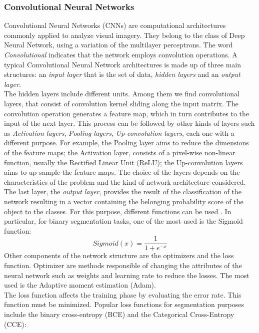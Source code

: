 \documentclass{standalone}
\begin{document}
\subsubsection{Convolutional Neural Networks} 
Convolutional Neural Networks (CNNs) are computational architectures commonly applied to analyze visual imagery.
They belong to the class of Deep Neural Network, using a variation of the multilayer perceptrons.
The word \textit{Convolutional} indicates that the network employs convolution operations.
A typical Convolutional Neural Network architectures is made up of three main structures: an \textit{input layer} that is the set of data, \textit{hidden layers} and an \textit{output layer}.
\\
The hidden layers include different units.
Among them we find convolutional layers, that consist of convolution kernel sliding along the input matrix.
The convolution operation generates a feature map, which in turn contributes to the input of the next layer\cite{CNN}.
This process can be followed by other kinds of layers such as \textit{Activation layers}, \textit{Pooling layers}, \textit{Up-convolution layers}, each one with a different purpose.
For example, the Pooling layer aims to reduce the dimensions of the feature maps; the Activation layer, consists of a pixel-wise non-linear function, usually the Rectified Linear Unit (ReLU); the Up-convolution layers aims to up-sample the feature maps.
The choice of the layers depends on the characteristics of the problem and the kind of network architecture considered.
\\
The last layer, the \textit{output layer}, provides the result of the classification of the network resulting in a vector containing the belonging probability score of the object to the classes.
For this purpose, different functions can be used \cite{camborata}.
In particular, for binary segmentation tasks, one of the most used is the Sigmoid function:
\begin{equation}
    Sigmoid(x) = \frac{1}{1 + e^{-x}}
\end{equation}
Other components of the network structure are the optimizers and the loss function. 
Optimizer are methods responsible of changing the attributes of the neural network such as weights and learning rate to reduce the losses. 
The most used is the Adaptive moment estimation (Adam)\cite{jovana}. 
\\
The loss function affects the training phase by evaluating the error rate.
This function must be minimized. 
Popular loss functions for segmentation purposes include the binary cross-entropy (BCE) and the Categorical Cross-Entropy (CCE):
\end{document}
